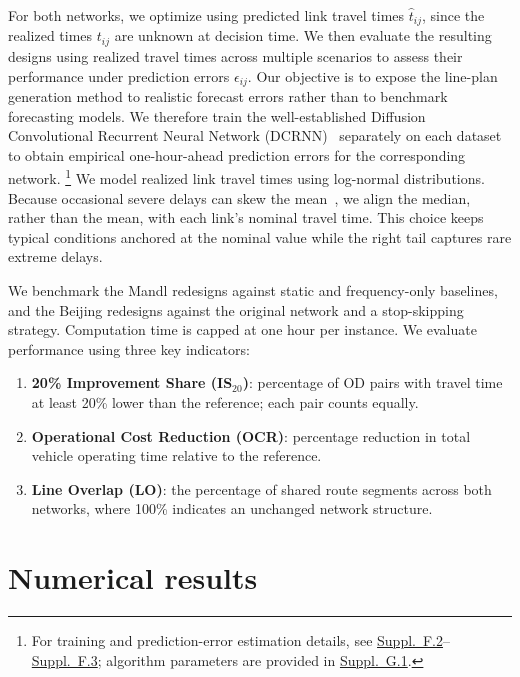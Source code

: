 \documentclass[11pt,a4paper]{article} %
\DeclareRobustCommand{\suppref}[1]{\href{https://github.com/zihao-guo/P2-5_CASPT_paper/blob/main/suppl/suppl.pdf}{Suppl.~#1}}
\begin{document}
For both networks, we optimize using predicted link travel times $\hat t_{ij}$, since the realized times $t_{ij}$ are unknown at decision time. We then evaluate the resulting designs using realized travel times across multiple scenarios to assess their performance under prediction errors $\epsilon_{ij}$. Our objective is to expose the line-plan generation method to realistic forecast errors rather than to benchmark forecasting models. We therefore train the well-established Diffusion Convolutional Recurrent Neural Network (DCRNN)~\citep{li2017diffusion} separately on each dataset to obtain empirical one-hour-ahead prediction errors for the corresponding network. \footnote{For training and prediction-error estimation details, see \suppref{F.2}--\suppref{F.3}; algorithm parameters are provided in \suppref{G.1}.} We model realized link travel times using log-normal distributions. Because occasional severe delays can skew the mean~\citep{guessous2014estimating}, we align the median, rather than the mean, with each link's nominal travel time. This choice keeps typical conditions anchored at the nominal value while the right tail captures rare extreme delays.

We benchmark the Mandl redesigns against static and frequency-only baselines, and the Beijing redesigns against the original network and a stop-skipping strategy. Computation time is capped at one hour per instance. We evaluate performance using three key indicators:
\begin{enumerate}[nosep,leftmargin=*]
\item \textbf{20\% Improvement Share (IS$_{20}$)}: percentage of OD pairs with travel time at least 20\% lower than the reference; each pair counts equally.
\item \textbf{Operational Cost Reduction (OCR)}: percentage reduction in total vehicle operating time relative to the reference.
\item \textbf{Line Overlap (LO)}: the percentage of shared route segments across both networks, where 100\% indicates an unchanged network structure.
\end{enumerate}



\section{Numerical results}
\end{document}
